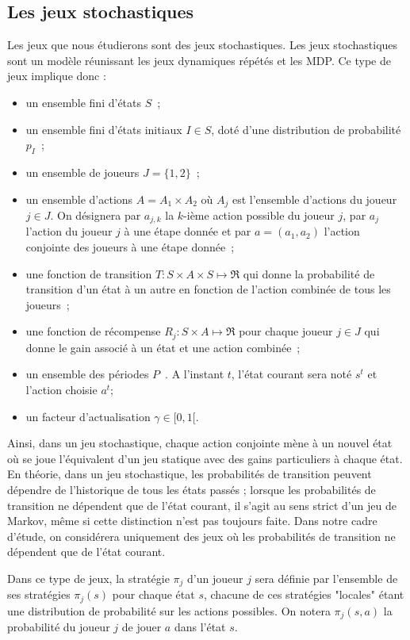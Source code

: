 \documentclass{article}
\begin{document}
\subsection{Les jeux stochastiques}
Les jeux que nous étudierons sont des jeux stochastiques. Les jeux stochastiques sont un modèle réunissant les jeux dynamiques répétés et les MDP. Ce type de jeux implique donc :

\begin{itemize}
\item un ensemble fini d'états \(S\)~;
\item un ensemble fini d'états initiaux \(I \in S\), doté d'une distribution de probabilité \(p_{I}\)~;
\item un ensemble de joueurs \(J = \{1, 2\}\)~;
\item un ensemble d'actions \(A = A_{1} \times A_{2}\)  où \(A_{j}\) est l'ensemble d'actions du joueur \(j \in J\). On désignera par \(a_{j, k}\) la \(k\)-ième action possible du joueur \(j\), par \(a_j\) l'action du joueur \(j\) à une étape donnée et par \(a = (a_1, a_2)\) l'action conjointe des joueurs à une étape donnée~;
\item une fonction de transition \(T : S \times A \times S \mapsto \Re\) qui donne la probabilité de transition d'un état à un autre en fonction de l'action combinée de tous les joueurs~;
\item une fonction de récompense \(R_{j} : S \times A \mapsto \Re\) pour chaque joueur \(j \in J\) qui donne le gain associé à un état et une action combinée~;
\item un ensemble des périodes \(P\)~. A l'instant \(t\), l'état courant sera noté \(s^t\) et l'action choisie  \(a^t\);
\item un facteur d'actualisation \(\gamma \in [0, 1[\).
\end{itemize}

Ainsi, dans un jeu stochastique, chaque action conjointe mène à un nouvel état où se joue l’équivalent d’un jeu statique avec des gains particuliers à chaque état. En théorie, dans un jeu stochastique, les probabilités de transition peuvent dépendre de l’historique de tous les états passés ; lorsque les probabilités de transition ne dépendent que de l’état courant, il s’agit au sens strict d’un jeu de Markov, même si cette distinction n’est pas toujours faite. Dans notre cadre d’étude, on considérera uniquement des jeux où les probabilités de transition ne dépendent que de l’état courant.

Dans ce type de jeux, la stratégie \(\pi_j\) d'un joueur \(j\) sera définie par l'ensemble de ses stratégies \(\pi_j(s)\) pour chaque état \(s\), chacune de ces stratégies "locales" étant une distribution de probabilité sur les actions possibles. On notera  \(\pi_j(s,a)\) la probabilité du joueur \(j\) de jouer \(a\) dans l'état \(s\).
\end{document}
